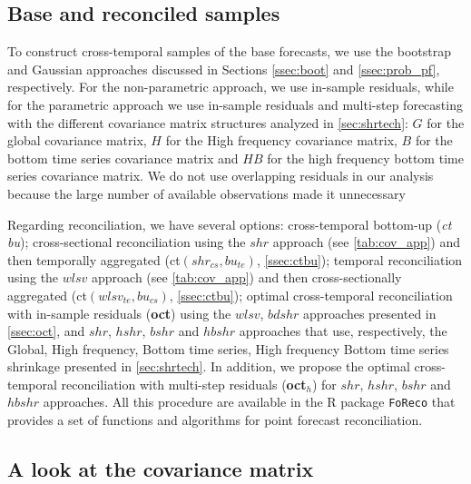\documentclass[a4paper,11pt]{article}
\theoremstyle{definition}
\begin{document}
\subsection{Base and reconciled samples}\label{ssec:sim_br}

To construct cross-temporal samples of the base forecasts, we use the bootstrap and Gaussian approaches discussed in Sections \ref{ssec:boot} and \ref{ssec:prob_pf}, respectively. For the non-parametric approach, we use in-sample residuals, while for the parametric approach we use in-sample residuals and multi-step forecasting with the different covariance matrix structures analyzed in \autoref{sec:shrtech}: $G$ for the global covariance matrix, $H$ for the High frequency covariance matrix, $B$ for the bottom time series covariance matrix and $HB$ for the high frequency bottom time series covariance matrix. We do not use overlapping residuals in our analysis because the large number of available observations made it unnecessary %

Regarding reconciliation, we have several options: cross-temporal bottom-up (\textit{ct bu}); cross-sectional reconciliation using the $shr$ approach (see \autoref{tab:cov_app}) and then temporally aggregated (ct$(shr_{cs}, bu_{te})$, \autoref{ssec:ctbu});  temporal reconciliation using the $wlsv$ approach (see \autoref{tab:cov_app}) and then cross-sectionally aggregated (ct$(wlsv_{te}, bu_{cs})$, \autoref{ssec:ctbu}); optimal cross-temporal reconciliation \citep{difonzo2023} with in-sample residuals (\textbf{oct}) using the $wlsv$, $bdshr$ approaches presented in \autoref{ssec:oct}, and $shr$, $hshr$, $bshr$ and $hbshr$ approaches that use, respectively, the Global, High frequency, Bottom time series, High frequency Bottom time series shrinkage presented in \autoref{sec:shrtech}. In addition, we propose the optimal cross-temporal reconciliation with multi-step residuals (\textbf{oct$_h$}) for $shr$, $hshr$, $bshr$ and $hbshr$ approaches. All this procedure are available in the \textsf{R} package \texttt{FoReco} \citep{girolimetto2022} that provides a set of functions and algorithms for point forecast reconciliation.

\subsection{A look at the covariance matrix}
\end{document}
